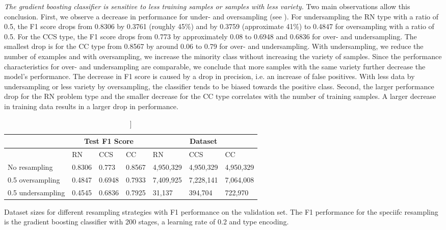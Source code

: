 \textit{The gradient boosting classifier is sensitive to less training samples or samples with less variety.} Two main observations allow this conclusion. First, we observe a decrease in performance for under- and oversampling (see  ). For undersampling the RN type with a ratio of 0.5, the F1 score drops from 0.8306 by 0.3761 (roughly 45\%) and by 0.3759 (approximate 41\%) to 0.4847 for oversampling with a ratio of 0.5. For the CCS type, the F1 score drops from 0.773 by approximately 0.08 to 0.6948 and 0.6836 for over- and undersampling. The smallest drop is for the CC type from 0.8567 by around 0.06 to 0.79 for over- and undersampling. With undersampling, we reduce the number of examples and with oversampling, we increase the minority class without increasing the variety of samples. Since the performance characteristics for over- and undersampling are comparable, we conclude that more samples with the same variety further decrease the model's performance. The decrease in F1 score is caused by a drop in precision, i.e. an increase of false positives. With less data by undersampling or less variety by oversampling, the classifier tends to be biased towards the positive class.
Second, the larger performance drop for the RN problem type and the smaller decrease for the CC type correlates with the number of training samples. A larger decrease in training data results in a larger drop in performance. 

\begin{table}[]
    \tabcolsep=0.11cm
    \begin{tabularx}{\textwidth}{lXXX|XXX}
    \toprule
                        & \multicolumn{3}{c}{Test F1 Score} & \multicolumn{3}{c}{Dataset}   \\ \midrule
                        & RN        & CCS        & CC     & RN            & CCS         & CC          \\ \midrule
    No resampling     &  0.8306   &  0.773    &  0.8567  &  4,950,329    & 4,950,329   & 4,950,329   \\
    0.5 oversampling  &  0.4847   &  0.6948   &  0.7933  &  7,409,925    & 7,228,141   & 7,064,008   \\
    0.5 undersampling &  0.4545   &  0.6836   &  0.7925  &  31,137       & 394,704     & 722,970     \\ \bottomrule
    \end{tabularx}
    \caption[Dataset sizes for different resampling strategies and performance for gradient boosting classifier]]{Dataset sizes for different resampling strategies with F1 performance on the validation set. The F1 performance for the speciifc resampling is the gradient boosting classifier with 200 stages, a learning rate of 0.2 and type encoding.}
    \label{tab:resampling_size_performance_gbc}
    \end{table}


